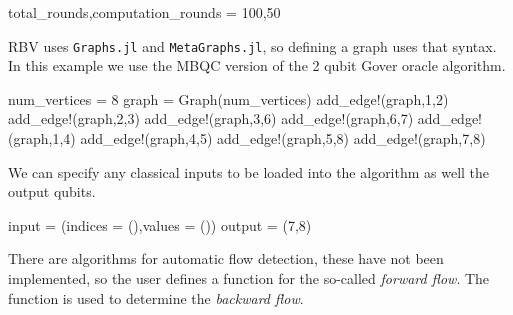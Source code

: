 \documentclass[
]{article}
\newenvironment{Shaded}{}{}
\newcommand{\FloatTok}[1]{\textcolor[rgb]{0.25,0.63,0.44}{#1}}
\newcommand{\FunctionTok}[1]{\textcolor[rgb]{0.02,0.16,0.49}{#1}}
\newcommand{\NormalTok}[1]{#1}
\newcommand{\OperatorTok}[1]{\textcolor[rgb]{0.40,0.40,0.40}{#1}}
\begin{document}
\begin{Shaded}
\begin{Highlighting}[]
\NormalTok{total\_rounds,computation\_rounds }\OperatorTok{=} \FloatTok{100}\NormalTok{,}\FloatTok{50}
\end{Highlighting}
\end{Shaded}

RBV uses \texttt{Graphs.jl} and \texttt{MetaGraphs.jl}, so defining a
graph uses that syntax. In this example we use the MBQC version of the 2
qubit Gover oracle algorithm.

\begin{Shaded}
\begin{Highlighting}[]
\NormalTok{    num\_vertices }\OperatorTok{=} \FloatTok{8}
\NormalTok{    graph }\OperatorTok{=} \FunctionTok{Graph}\NormalTok{(num\_vertices)}
    \FunctionTok{add\_edge!}\NormalTok{(graph,}\FloatTok{1}\NormalTok{,}\FloatTok{2}\NormalTok{)}
    \FunctionTok{add\_edge!}\NormalTok{(graph,}\FloatTok{2}\NormalTok{,}\FloatTok{3}\NormalTok{)}
    \FunctionTok{add\_edge!}\NormalTok{(graph,}\FloatTok{3}\NormalTok{,}\FloatTok{6}\NormalTok{)}
    \FunctionTok{add\_edge!}\NormalTok{(graph,}\FloatTok{6}\NormalTok{,}\FloatTok{7}\NormalTok{)}
    \FunctionTok{add\_edge!}\NormalTok{(graph,}\FloatTok{1}\NormalTok{,}\FloatTok{4}\NormalTok{)}
    \FunctionTok{add\_edge!}\NormalTok{(graph,}\FloatTok{4}\NormalTok{,}\FloatTok{5}\NormalTok{)}
    \FunctionTok{add\_edge!}\NormalTok{(graph,}\FloatTok{5}\NormalTok{,}\FloatTok{8}\NormalTok{)}
    \FunctionTok{add\_edge!}\NormalTok{(graph,}\FloatTok{7}\NormalTok{,}\FloatTok{8}\NormalTok{)}
\end{Highlighting}
\end{Shaded}

We can specify any classical inputs to be loaded into the algorithm as
well the output qubits.

\begin{Shaded}
\begin{Highlighting}[]
\NormalTok{    input }\OperatorTok{=}\NormalTok{ (indices }\OperatorTok{=}\NormalTok{ (),values }\OperatorTok{=}\NormalTok{ ())}
\NormalTok{    output }\OperatorTok{=}\NormalTok{ (}\FloatTok{7}\NormalTok{,}\FloatTok{8}\NormalTok{)}
\end{Highlighting}
\end{Shaded}

There are algorithms for automatic flow detection, these have not been
implemented, so the user defines a function for the so-called
\emph{forward flow}. The function is used to determine the
\emph{backward flow}.
\end{document}

